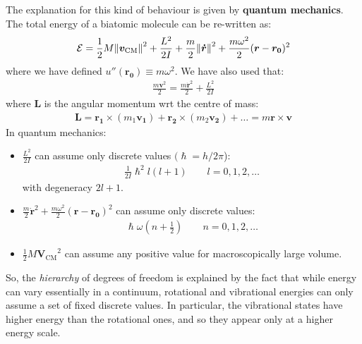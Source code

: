 \documentclass[../../main.tex]{subfiles}
\begin{document}
The explanation for this kind of  behaviour is given by \textbf{quantum mechanics}. The total energy of a biatomic molecule can be re-written as:
\begin{align*}
    \mathcal{E} = \frac{1}{2} M \norm{\bm{v}_{\mathrm{CM} }}^2 + \frac{L^2}{2 I} + \frac{m}{2} \norm{\bm{\dot{r}}}^2 + \frac{m \omega^2}{2} (\bm{r} - \bm{r_0})^2   
\end{align*} 
where we have defined $u''(\bm{r_0}) \equiv m \omega^2$. We have also used that:
\begin{align*}
    \frac{m \bm{v}^2}{2} = \frac{m \bm{\dot{r}}^2}{2} + \frac{L^2}{2 I}   
\end{align*}
where $\bm{L}$ is the angular momentum wrt the centre of mass:
\begin{align*}
    \bm{L} = \bm{r_1} \times (m_1 \bm{v_1}) + \bm{r_2} \times (m_2 \bm{v_2}) + \dots = m \bm{r} \times \bm{v}
\end{align*}
In quantum mechanics:
\begin{itemize}
    \item $\frac{L^2}{2I}$ can assume only discrete values $(\hslash = h/2\pi$):
    \begin{align*}
        \frac{1}{2 I} \hslash^2 l(l+1) \qquad l = 0,1,2,\dots 
    \end{align*} 
    with degeneracy $2l+1$.
    \item $\displaystyle \frac{m}{2} \dot{\bm{r}}^2 + \frac{m \omega^2}{2} (\bm{r}-\bm{r_0})^2$ can assume only discrete values:  
    \begin{align*}
        \hslash \omega \left(n + \frac{1}{2} \right) \qquad n=0,1,2,\dots
    \end{align*}
    \item $\frac{1}{2} M \bm{V_{\mathrm{CM}}}^2$ can assume any positive value for macroscopically large volume. 
\end{itemize}
So, the \textit{hierarchy} of degrees of freedom is explained by the fact that while energy can vary essentially in a continuum, rotational and vibrational energies can only assume a set of fixed discrete values. In particular, the vibrational states have higher energy than the rotational ones, and so they appear only at a higher energy scale.

\medskip
\end{document}
